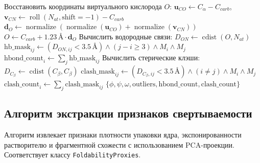 \documentclass[12pt, a4paper]{article}
\begin{document}
\begin{algorithm}[h]
\begin{algorithmic}[1]
\State Восстановить координаты виртуального кислорода $O$:
\State \quad $\mathbf{u}_{CO} \gets C_\alpha - C_{carb}$, $\mathbf{v}_{CN} \gets \operatorname{roll}(N_{at}, \text{shift}=-1) - C_{carb}$
\State \quad $\mathbf{d}_O \gets \operatorname{normalize}\left(\operatorname{normalize}(\mathbf{u}_{CO}) + \operatorname{normalize}(\mathbf{v}_{CN})\right)$
\State \quad $O \gets C_{carb} + 1.23\,\text{\AA} \cdot \mathbf{d}_O$
\State Вычислить водородные связи:
\State \quad $D_{ON} \gets \operatorname{cdist}(O, N_{at})$
\State \quad $\text{hb\_mask}_{ij} \gets (D_{ON, ij} < 3.5\,\text{\AA}) \land (j - i \ge 3) \land M_i \land M_j$
\State \quad $\text{hbond\_count}_i \gets \sum_{j} \text{hb\_mask}_{ij}$
\State Вычислить стерические клэши:
\State \quad $D_{C_\beta} \gets \operatorname{cdist}(C_\beta, C_\beta)$
\State \quad $\text{clash\_mask}_{ij} \gets (D_{C_\beta, ij} < 3.5\,\text{\AA}) \land (i \neq j) \land M_i \land M_j$
\State \quad $\text{clash\_count}_i \gets \sum_{j} \text{clash\_mask}_{ij}$
\State \Return $\{\phi, \psi, \omega, \text{outliers}, \text{hbond\_count}, \text{clash\_count}\}$
\end{algorithmic}
\end{algorithm}

\newpage

\subsection{Алгоритм экстракции признаков свертываемости}
Алгоритм извлекает признаки плотности упаковки ядра, экспонированности растворителю и фрагментной схожести с использованием PCA-проекции. Соответствует классу \texttt{FoldabilityProxies}.
\end{document}
